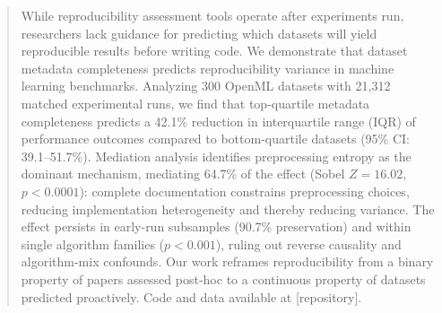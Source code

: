 \begin{abstract}
While reproducibility assessment tools operate after experiments run, researchers lack guidance for predicting which datasets will yield reproducible results before writing code. We demonstrate that dataset metadata completeness predicts reproducibility variance in machine learning benchmarks. Analyzing 300 OpenML datasets with 21,312 matched experimental runs, we find that top-quartile metadata completeness predicts a 42.1\% reduction in interquartile range (IQR) of performance outcomes compared to bottom-quartile datasets (95\% CI: 39.1--51.7\%). Mediation analysis identifies preprocessing entropy as the dominant mechanism, mediating 64.7\% of the effect (Sobel $Z = 16.02$, $p < 0.0001$): complete documentation constrains preprocessing choices, reducing implementation heterogeneity and thereby reducing variance. The effect persists in early-run subsamples (90.7\% preservation) and within single algorithm families ($p < 0.001$), ruling out reverse causality and algorithm-mix confounds. Our work reframes reproducibility from a binary property of papers assessed post-hoc to a continuous property of datasets predicted proactively. Code and data available at [repository].
\end{abstract}
